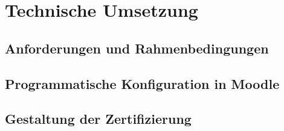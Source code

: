 \chapter{Technische Umsetzung}
\section{Anforderungen und Rahmenbedingungen}
\section{Programmatische Konfiguration in Moodle}
\section{Gestaltung der Zertifizierung}




